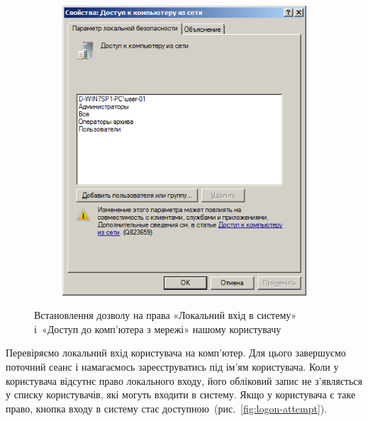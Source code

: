 \documentclass[
	a4paper,
	oneside,
	DIV = 12,
	fontsize = 13pt,
	headings = normal,
]{scrartcl}
\begin{document}
\begin{figure}[!htbp]
\begin{subfigure}[t]{0.5\columnwidth}
					\includegraphics[height = 11\baselineskip]{../01-solution/y03s01-pcdiag-lab-08-p10.png}
					\caption{}
					\label{}
				\end{subfigure}%
				\caption{Встановлення дозволу на права «Локальний вхід в систему» і~«Доступ до комп'ютера з мережі» нашому користувачу}
				\label{fig:user-rights-assignment}
			\end{figure}

			Перевіряємо локальний вхід користувача на комп'ютер. Для цього завершуємо поточний сеанс і намагаємось зареєструватись під ім'ям користувача. Коли у користувача відсутнє право локального входу, його обліковий запис не з'являється у списку користувачів, які могуть входити в систему. Якщо у користувача є таке право, кнопка входу в систему стає доступною~(рис.~\ref{fig:logon-attempt}).
\end{document}
